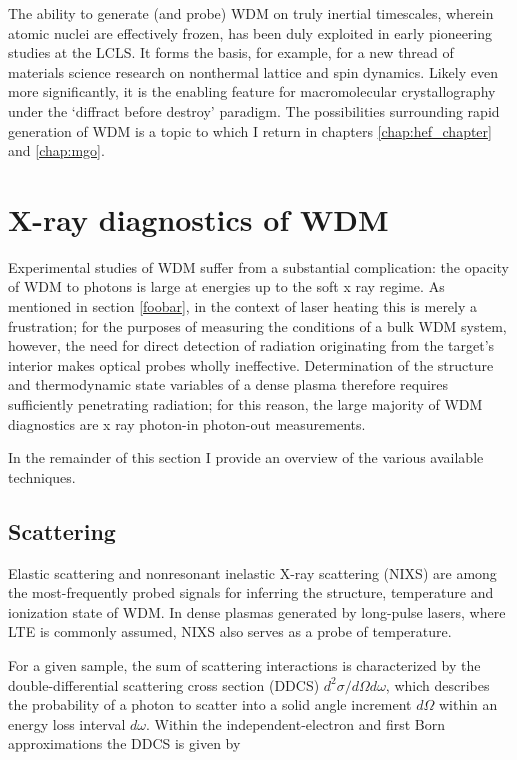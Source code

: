 \documentclass [11pt, proquest, article] {uwthesis}[2016/11/22]
\begin{document}
The ability to generate (and probe) WDM on truly inertial timescales, wherein atomic nuclei are effectively frozen, has been duly exploited in early pioneering studies at the LCLS. It forms the basis, for example, for a new thread of materials science research on nonthermal lattice and spin dynamics. \cite{lee2012non, lee2003finite}  Likely even more significantly, it is the enabling feature for macromolecular crystallography under the `diffract before destroy' paradigm. The possibilities surrounding rapid generation of WDM is a topic to which I return in chapters \ref{chap:hef_chapter} and \ref{chap:mgo}. \cite{vinko2012creation}

\section{X-ray diagnostics of WDM}
Experimental studies of WDM suffer from a substantial complication: the opacity of WDM to photons is large at energies up to the soft x ray regime. As mentioned in section \ref{foobar}, in the context of laser heating this is merely a frustration; for the purposes of measuring the conditions of a bulk WDM system, however, the need for direct detection of radiation originating from the target's interior makes optical probes wholly ineffective. Determination of the structure and thermodynamic state variables of a dense plasma therefore requires sufficiently penetrating radiation; for this reason, the large majority of WDM diagnostics are x ray photon-in photon-out measurements. \cite{glenzer2009x}

In the remainder of this section I provide an overview of the various available techniques.

\subsection{Scattering}
Elastic scattering and nonresonant inelastic X-ray scattering (NIXS) are among the most-frequently probed signals for inferring the structure, temperature and ionization state of WDM. In dense plasmas generated by long-pulse lasers, where LTE is commonly assumed, NIXS also serves as a probe of temperature.

For a given sample, the sum of scattering interactions is characterized by the double-differential scattering cross section (DDCS) $d^2\sigma/d\Omega d\omega$, which describes the probability of a photon to scatter into a solid angle increment $d\Omega$ within an energy loss interval $d\omega$. Within the independent-electron and first Born approximations the DDCS is given by
\end{document}

